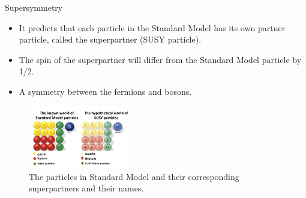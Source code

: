 \documentclass[mathserif,serif]{beamer}
\begin{document}
\begin{frame}{Supersymmetry}
\begin{itemize}
\item It predicts that each particle in the Standard Model has its own partner particle, called the superpartner (SUSY particle).
\item The spin of the superpartner will differ from the Standard Model particle by 1/2.
\item A symmetry between the fermions and bosons.
\end{itemize}
\begin{figure}
\centering
\includegraphics[width=0.4\textwidth]{data/photo/theory/SM-SUSY-diagram.jpg}
\caption{The particles in Standard Model and their corresponding superpartners and their names.}
\end{figure}
\end{frame}
\end{document}
